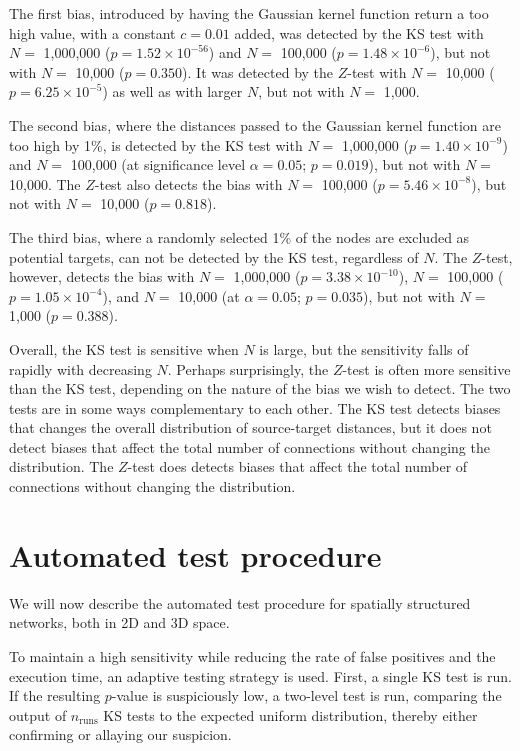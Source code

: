 The first bias, introduced by having the Gaussian kernel function return a too high value, with a constant $c = 0.01$ added, was detected by the KS test with $N =$ 1,000,000 ($p = 1.52\times 10^{-56}$) and $N =$ 100,000 ($p = 1.48\times 10^{-6}$), but not with $N =$ 10,000 ($p = 0.350$). It was detected by the $Z$-test with $N =$ 10,000 ($p = 6.25\times 10^{-5}$) as well as with larger $N$, but not with $N =$ 1,000.

The second bias, where the distances passed to the Gaussian kernel function are too high by 1\%, is detected by the KS test with $N =$ 1,000,000 ($p = 1.40\times 10^{-9}$) and $N =$ 100,000 (at significance level $\alpha = 0.05$; $p = 0.019$), but not with $N =$ 10,000. The $Z$-test also detects the bias with $N =$ 100,000 ($p = 5.46\times 10^{-8}$), but not with $N =$ 10,000 ($p = 0.818$).

The third bias, where a randomly selected 1\% of the nodes are excluded as potential targets, can not be detected by the KS test, regardless of $N$. The $Z$-test, however, detects the bias with $N =$ 1,000,000 ($p = 3.38\times 10^{-10}$), $N =$ 100,000 ($p = 1.05 \times 10^{-4}$), and $N =$ 10,000 (at $\alpha = 0.05$; $p = 0.035$), but not with $N =$ 1,000 ($p = 0.388$).

Overall, the KS test is sensitive when $N$ is large, but the sensitivity falls of rapidly with decreasing $N$. Perhaps surprisingly, the $Z$-test is often more sensitive than the KS test, depending on the nature of the bias we wish to detect. The two tests are in some ways complementary to each other. The KS test detects biases that changes the overall distribution of source-target distances, but it does not detect biases that affect the total number of connections without changing the distribution. The $Z$-test does detects biases that affect the total number of connections without changing the distribution. 

\graphicspath{{figs/spatial}}



\section{Automated test procedure\label{sec:auto_spatial}}

We will now describe the automated test procedure for spatially structured networks, both in 2D and 3D space.

To maintain a high sensitivity while reducing the rate of false positives and the execution time, an adaptive testing strategy is used. First, a single KS test is run. If the resulting $p$-value is suspiciously low, a two-level test is run, comparing the output of $n_\text{runs}$ KS tests to the expected uniform distribution, thereby either confirming or allaying our suspicion. 

